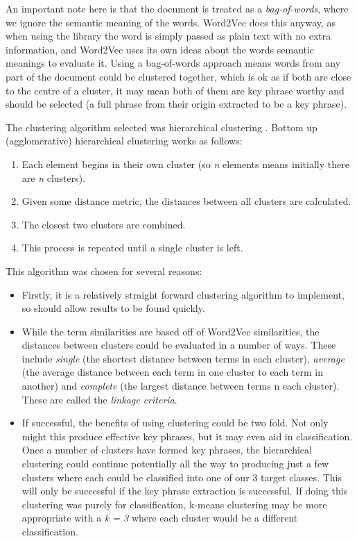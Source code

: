 An important note here is that the document is treated as a \textit{bag-of-words}, where we ignore the semantic meaning of the words. Word2Vec does this anyway, as when using the library the word is simply passed as plain text with no extra information, and Word2Vec uses its own ideas about the words semantic meanings to evaluate it. Using a bag-of-words approach means words from any part of the document could be clustered together, which is ok as if both are close to the centre of a cluster, it may mean both of them are key phrase worthy and should be selected (a full phrase from their origin extracted to be a key phrase).

The clustering algorithm selected was hierarchical clustering \cite{Rai2010}. Bottom up (agglomerative) hierarchical clustering works as follows:
\begin{enumerate}
	\item Each element begins in their own cluster (so \textit{n} elements means initially there are \textit{n} clusters).
	\item Given some distance metric, the distances between all clusters are calculated.
	\item The closest two clusters are combined.
	\item This process is repeated until a single cluster is left.
\end{enumerate}
\noindent This algorithm was chosen for several reasons:
\begin{itemize}
	\item Firstly, it is a relatively straight forward clustering algorithm to implement, so should allow results to be found quickly.
	\item While the term similarities are based off of Word2Vec similarities, the distances between clusters could be evaluated in a number of ways. These include \textit{single} (the shortest distance between terms in each cluster), \textit{average} (the average distance between each term in one cluster to each term in another) and \textit{complete} (the largest distance between terms n each cluster). These are called the \textit{linkage criteria}.
	\item If successful, the benefits of using clustering could be two fold. Not only might this produce effective key phrases, but it may even aid in classification. Once a number of clusters have formed key phrases, the hierarchical clustering could continue potentially all the way to producing just a few clusters where each could be classified into one of our 3 target classes. This will only be successful if the key phrase extraction is successful. If doing this clustering was purely for classification, k-means clustering may be more appropriate with a \textit{k = 3} where each cluster would be a different classification.
\end{itemize}

